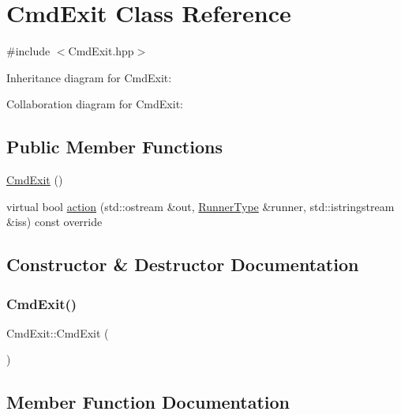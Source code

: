 \hypertarget{classCmdExit}{}\section{Cmd\+Exit Class Reference}
\label{classCmdExit}


{\ttfamily \#include $<$Cmd\+Exit.\+hpp$>$}



Inheritance diagram for Cmd\+Exit\+:


Collaboration diagram for Cmd\+Exit\+:
\subsection*{Public Member Functions}
\begin{DoxyCompactItemize}
\item 
\hyperlink{classCmdExit_ac4d01ff5e1b7de1ad4b54c2313da053c}{Cmd\+Exit} ()
\item 
virtual bool \hyperlink{classCmdExit_a51706475cf423b184855ba45fd7fa1a7}{action} (std\+::ostream \&out, \hyperlink{Command_8hpp_ad45c3de597c2023a8be0399d914161f4}{Runner\+Type} \&runner, std\+::istringstream \&iss) const override
\end{DoxyCompactItemize}


\subsection{Constructor \& Destructor Documentation}
\mbox{\label{classCmdExit_ac4d01ff5e1b7de1ad4b54c2313da053c}} 
\subsubsection{\texorpdfstring{Cmd\+Exit()}{CmdExit()}}
{\footnotesize\ttfamily Cmd\+Exit\+::\+Cmd\+Exit (\begin{DoxyParamCaption}{ }\end{DoxyParamCaption})}



\subsection{Member Function Documentation}
\mbox{\label{classCmdExit_a51706475cf423b184855ba45fd7fa1a7}} 
